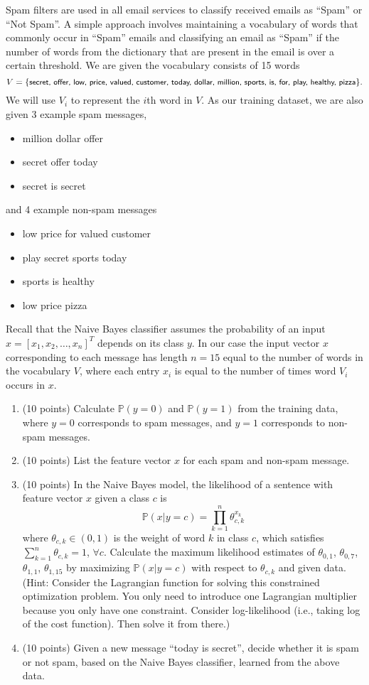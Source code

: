 \documentclass[twoside,12pt]{article}
\begin{document}
\begin{enumerate}
Spam filters are used in all email services to classify received emails as ``Spam'' or ``Not Spam''. A simple approach involves maintaining a vocabulary of words that commonly occur in ``Spam'' emails and classifying an email as ``Spam'' if the number of words from the dictionary that are present in the email is over a certain threshold.
We are given the vocabulary consists of 15 words 
\[\small V=\{\textsf{secret, offer, low, price, valued, customer, today, dollar, million, sports, is, for, play, healthy, pizza}\}.\] We will use $V_i$ to represent the $i$th word in $V$. As our training dataset, we are also given 3 example spam messages,
\begin{itemize}
\item \textsf{million dollar offer}
\item \textsf{secret offer today}
\item \textsf{secret is secret}
\end{itemize}
and 4 example non-spam messages
\begin{itemize}
\item \textsf{low price for valued customer}
\item \textsf{play secret sports today}
\item \textsf{sports is healthy}
\item \textsf{low price pizza}
\end{itemize}

Recall that the Naive Bayes classifier assumes the probability of an input $x = [x_1, x_2, \ldots, x_n]^T$ depends on its class $y$. In our case the input vector $x$ corresponding to each message has length $n = 15$ equal to the number of words in the vocabulary $V$, where each entry $x_i$ is equal to the number of times word $V_i$ occurs in $x$.

\begin{enumerate}
\item (10 points) Calculate $\mathbb P(y = 0)$ and $\mathbb P(y = 1)$ from the training data, where $y = 0$ corresponds to spam messages, and $y = 1$ corresponds to non-spam messages.
\item (10 points) List the feature vector $x$ for each spam and non-spam message.
\item (10 points) In the Naive Bayes model, the likelihood of a sentence with feature vector $x$ given a class $c$ is
\[
\mathbb P (x|y = c) = \prod_{k=1}^n \theta_{c, k}^{x_k}
\]
where $\theta_{c,k} \in (0, 1)$ is the weight of word $k$ in class $c$, which satisfies $\sum_{k=1}^n \theta_{c, k} = 1$, $\forall c$. Calculate the maximum likelihood estimates of $\theta_{0,1}$, $\theta_{0,7}$, $\theta_{1,1}$, $\theta_{1,15}$ by maximizing $\mathbb P (x|y = c)$ with respect to $\theta_{c, k}$ and given data. (Hint: Consider the Lagrangian function for solving this constrained optimization problem. You only need to introduce one Lagrangian multiplier because you only have one constraint. Consider log-likelihood (i.e., taking log of the cost function). Then solve it from there.)
\item (10 points) Given a new message ``\textsf{today is secret}'', decide whether it is spam or not spam, based on the Naive
Bayes classifier, learned from the above data.


\end{enumerate}
\end{enumerate}
\end{document}
